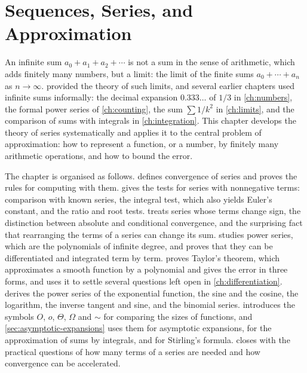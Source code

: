 \chapter{Sequences, Series, and Approximation}
\label{ch:series}


An infinite sum $a_0+a_1+a_2+\cdots$ is not a sum in the sense of arithmetic, which adds finitely many numbers, but a limit: the limit of the finite sums $a_0+\cdots+a_n$ as $n\to\infty$.  provided the theory of such limits, and several earlier chapters used infinite sums informally: the decimal expansion $0.333\ldots$ of $1/3$ in \cref{ch:numbers}, the formal power series of \cref{ch:counting}, the sum $\sum1/k^2$ in \cref{ch:limits}, and the comparison of sums with integrals in \cref{ch:integration}. This chapter develops the theory of series systematically and applies it to the central problem of approximation: how to represent a function, or a number, by finitely many arithmetic operations, and how to bound the error.

The chapter is organised as follows.  defines convergence of series and proves the rules for computing with them.  gives the tests for series with nonnegative terms: comparison with known series, the integral test, which also yields Euler's constant, and the ratio and root tests.  treats series whose terms change sign, the distinction between absolute and conditional convergence, and the surprising fact that rearranging the terms of a series can change its sum.  studies power series, which are the polynomials of infinite degree, and proves that they can be differentiated and integrated term by term.  proves Taylor's theorem, which approximates a smooth function by a polynomial and gives the error in three forms, and uses it to settle several questions left open in \cref{ch:differentiation}.  derives the power series of the exponential function, the sine and the cosine, the logarithm, the inverse tangent and sine, and the binomial series.  introduces the symbols $O$, $o$, $\Theta$, $\Omega$ and $\sim$ for comparing the sizes of functions, and \cref{sec:asymptotic-expansions} uses them for asymptotic expansions, for the approximation of sums by integrals, and for Stirling's formula.  closes with the practical questions of how many terms of a series are needed and how convergence can be accelerated.

